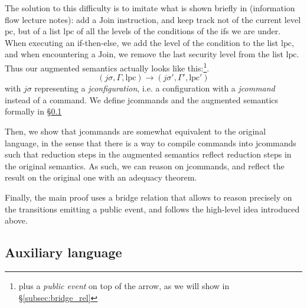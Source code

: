 \documentclass[10pt]{article}
\newcommand{\pc}{\mathrm{pc}}
\newcommand{\lpc}{\mathrm{lpc}}
\newcommand{\ctx}{\Gamma}
\begin{document}
The solution to this difficulty is to imitate what is shown briefly in (information flow lecture notes): add a \( \mathrm{Join} \) instruction, and keep track not of the current level \( \pc \), but of a list \( \lpc \) of all the levels of the conditions of the ifs we are under. When executing an if-then-else, we add the level of the condition to the list \( \lpc \), and when encountering a \( \mathrm{Join} \), we remove the last security level from the list \( \lpc \). Thus our augmented semantics actually looks like this:\footnote{plus a \emph{public event} on top of the arrow, as we will show in \S\ref{subsec:bridge_rel}}.
\[ (j\sigma, \ctx, \lpc) \to (j\sigma', \ctx', \lpc') \]
with \( j\sigma \) representing a \emph{jconfiguration}, i.e. a configuration with a \emph{jcommand} instead of a command. We define jcommands and the augmented semantics formally in \S\ref{subsec:aux_lang}








Then, we show that jcommands are somewhat equivalent to the original language, in the
sense that there is a way to compile commands into jcommands such that reduction steps in the augmented semantics reflect reduction steps in the original semantics. As such, we can reason on jcommands,
and reflect the result on the original one with an adequacy theorem.

Finally, the main proof uses a bridge relation that allows to reason precisely on the
transitions emitting a public event, and follows the high-level idea introduced above.

\subsection{Auxiliary language}%
\label{subsec:aux_lang}
\end{document}
